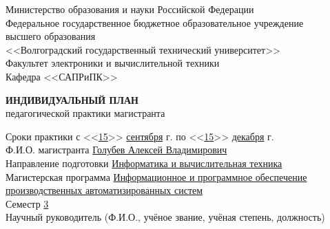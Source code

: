 \documentclass[a4paper, 14pt]{extreport}
\begin{document}
    \onehalfspacing
    \begin{titlepage}
        \begin{center}
            Министерство образования и науки Российской Федерации\\
            Федеральное государственное бюджетное образовательное учреждение\\
            высшего образования\\
            <<Волгоградский государственный технический университет>>\\
            Факультет электроники и вычислительной техники\\
            Кафедра <<САПРиПК>>
        \end{center}
        \vspace{2cm}
        \begin{center}
            \large \textbf{ИНДИВИДУАЛЬНЫЙ ПЛАН} \\
            педагогической практики магистранта
        \end{center}
        \vspace{2cm}
        Сроки практики с <<\underline{15}>> \underline{сентября} \the\year г. 
        по <<\underline{15}>> \underline{декабря} \the\year г.\\
        Ф.И.О. магистранта \underline{Голубев Алексей Владимирович\hspace{10.7em}} \\
        Направление подготовки \underline{Информатика и вычислительная техника\hspace{4.9em}} \\
        Магистерская программа \underline{Информационное и программное обеспечение\hspace{2.3em}}\\
        \underline{производственных автоматизированных систем\hspace{13em}} \\
        Семестр \underline{\hspace{1cm}3\hspace{1cm}} \\

        \noindent Научный руководитель (Ф.И.О., учёное звание, учёная степень, должность)\\
        \underline{\hspace{\textwidth}}\\
        \underline{\hspace{\textwidth}}\\
        \underline{\hspace{\textwidth}}
    \end{titlepage}
\end{document}
